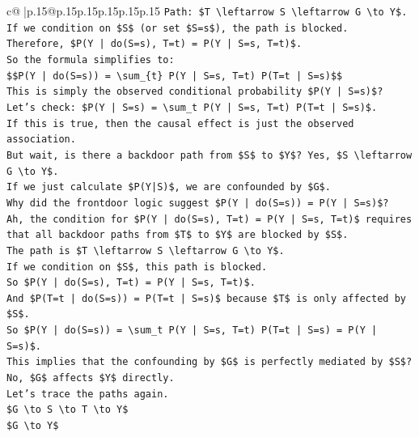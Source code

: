 \documentclass{article}
\begin{document}
{\begin{supertabular}{c@{$\;$}|p{.15\linewidth}@{}p{.15\linewidth}p{.15\linewidth}p{.15\linewidth}p{.15\linewidth}p{.15\linewidth}}
{{{\texttt{Path: \$T \textbackslash{}leftarrow S \textbackslash{}leftarrow G \textbackslash{}to Y\$.} \\
\texttt{If we condition on \$S\$ (or set \$S=s\$), the path is blocked.} \\
\texttt{Therefore, \$P(Y | do(S=s), T=t) = P(Y | S=s, T=t)\$.} \\
\texttt{So the formula simplifies to:} \\
\texttt{\$\$P(Y | do(S=s)) = \textbackslash{}sum\_\{t\} P(Y | S=s, T=t) P(T=t | S=s)\$\$} \\
\texttt{This is simply the observed conditional probability \$P(Y | S=s)\$?} \\
\texttt{Let's check: \$P(Y | S=s) = \textbackslash{}sum\_t P(Y | S=s, T=t) P(T=t | S=s)\$.} \\
\texttt{If this is true, then the causal effect is just the observed association.} \\
\texttt{But wait, is there a backdoor path from \$S\$ to \$Y\$? Yes, \$S \textbackslash{}leftarrow G \textbackslash{}to Y\$.} \\
\texttt{If we just calculate \$P(Y|S)\$, we are confounded by \$G\$.} \\
\texttt{Why did the frontdoor logic suggest \$P(Y | do(S=s)) = P(Y | S=s)\$?} \\
\texttt{Ah, the condition for \$P(Y | do(S=s), T=t) = P(Y | S=s, T=t)\$ requires that all backdoor paths from \$T\$ to \$Y\$ are blocked by \$S\$.} \\
\texttt{The path is \$T \textbackslash{}leftarrow S \textbackslash{}leftarrow G \textbackslash{}to Y\$.} \\
\texttt{If we condition on \$S\$, this path is blocked.} \\
\texttt{So \$P(Y | do(S=s), T=t) = P(Y | S=s, T=t)\$.} \\
\texttt{And \$P(T=t | do(S=s)) = P(T=t | S=s)\$ because \$T\$ is only affected by \$S\$.} \\
\texttt{So \$P(Y | do(S=s)) = \textbackslash{}sum\_t P(Y | S=s, T=t) P(T=t | S=s) = P(Y | S=s)\$.} \\
\texttt{This implies that the confounding by \$G\$ is perfectly mediated by \$S\$?} \\
\texttt{No, \$G\$ affects \$Y\$ directly.} \\
\texttt{Let's trace the paths again.} \\
\texttt{\$G \textbackslash{}to S \textbackslash{}to T \textbackslash{}to Y\$} \\
\texttt{\$G \textbackslash{}to Y\$} \\
}}}
\end{supertabular}}
\end{document}
